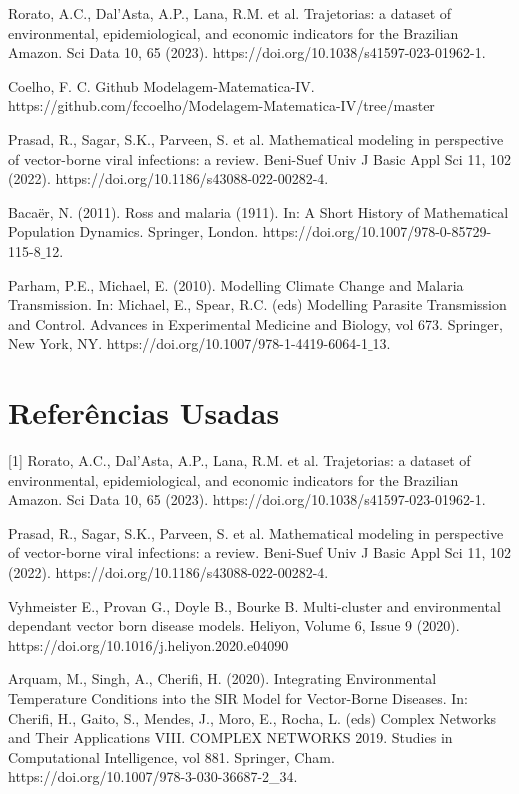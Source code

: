 \documentclass[12pt]{article}
\begin{document}
\noindent [4] Rorato, A.C., Dal’Asta, A.P., Lana, R.M. et al. Trajetorias: a dataset of environmental, epidemiological, and economic indicators for the Brazilian Amazon. Sci Data 10, 65 (2023). https://doi.org/10.1038/s41597-023-01962-1.

\noindent [5] Coelho, F. C. Github Modelagem-Matematica-IV. https://github.com/fccoelho/Modelagem-Matematica-IV/tree/master

\noindent [6] Prasad, R., Sagar, S.K., Parveen, S. et al. Mathematical modeling in perspective of vector-borne viral infections: a review. Beni-Suef Univ J Basic Appl Sci 11, 102 (2022). https://doi.org/10.1186/s43088-022-00282-4.

\noindent [7] Bacaër, N. (2011). Ross and malaria (1911). In: A Short History of Mathematical Population Dynamics. Springer, London. https://doi.org/10.1007/978-0-85729-115-8$\_$12.

\noindent [8] Parham, P.E., Michael, E. (2010). Modelling Climate Change and Malaria Transmission. In: Michael, E., Spear, R.C. (eds) Modelling Parasite Transmission and Control. Advances in Experimental Medicine and Biology, vol 673. Springer, New York, NY. https://doi.org/10.1007/978-1-4419-6064-1$\_$13.

\newpage
\section{Referências Usadas}

[1] Rorato, A.C., Dal’Asta, A.P., Lana, R.M. et al. Trajetorias: a dataset of environmental, epidemiological, and economic indicators for the Brazilian Amazon. Sci Data 10, 65 (2023). https://doi.org/10.1038/s41597-023-01962-1.

\noindent [2] Prasad, R., Sagar, S.K., Parveen, S. et al. Mathematical modeling in perspective of vector-borne viral infections: a review. Beni-Suef Univ J Basic Appl Sci 11, 102 (2022). https://doi.org/10.1186/s43088-022-00282-4.

\noindent [3] Vyhmeister E., Provan G., Doyle B., Bourke B. Multi-cluster and environmental dependant vector born disease models. Heliyon, Volume 6, Issue 9 (2020). https://doi.org/10.1016/j.heliyon.2020.e04090

\noindent [4] Arquam, M., Singh, A., Cherifi, H. (2020). Integrating Environmental Temperature Conditions into the SIR Model for Vector-Borne Diseases. In: Cherifi, H., Gaito, S., Mendes, J., Moro, E., Rocha, L. (eds) Complex Networks and Their Applications VIII. COMPLEX NETWORKS 2019. Studies in Computational Intelligence, vol 881. Springer, Cham. https://doi.org/10.1007/978-3-030-36687-2\_34.
\end{document}
